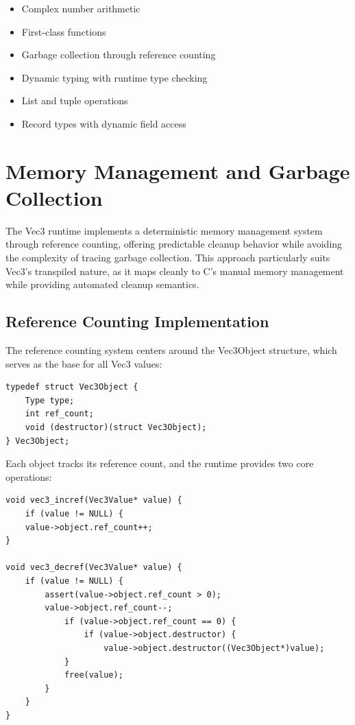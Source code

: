 \begin{itemize}[nolistsep]
\item Complex number arithmetic
\item First-class functions
\item Garbage collection through reference counting
\item Dynamic typing with runtime type checking
\item List and tuple operations
\item Record types with dynamic field access
\end{itemize}

\section{Memory Management and Garbage Collection}
\label{sec:memory-management}

The Vec3 runtime implements a deterministic memory management system through reference counting, offering predictable cleanup behavior while avoiding the complexity of tracing garbage collection.
This approach particularly suits Vec3's transpiled nature, as it maps cleanly to C's manual memory management while providing automated cleanup semantics.

\subsection{Reference Counting Implementation}\label{subsec:reference-counting-implementation}
The reference counting system centers around the Vec3Object structure, which serves as the base for all Vec3 values:

\begin{verbatim}
typedef struct Vec3Object {
    Type type;
    int ref_count;
    void (destructor)(struct Vec3Object);
} Vec3Object;
\end{verbatim}

Each object tracks its reference count, and the runtime provides two core operations:

\begin{verbatim}
void vec3_incref(Vec3Value* value) {
    if (value != NULL) {
    value->object.ref_count++;
}

void vec3_decref(Vec3Value* value) {
    if (value != NULL) {
        assert(value->object.ref_count > 0);
        value->object.ref_count--;
            if (value->object.ref_count == 0) {
                if (value->object.destructor) {
                    value->object.destructor((Vec3Object*)value);
            }
            free(value);
        }
    }
}
\end{verbatim}

